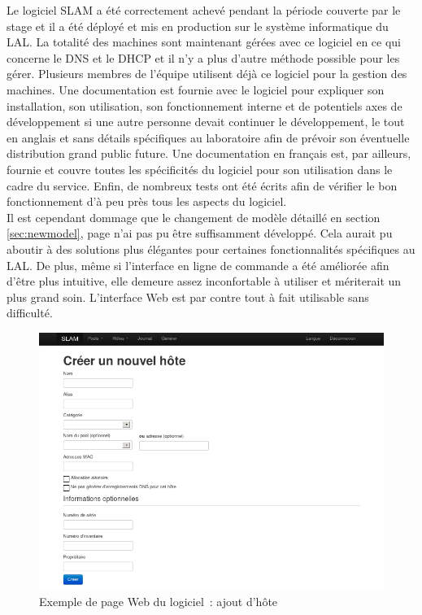 \documentclass[12pt,a4paper,twoside]{report}
\begin{document}
Le logiciel SLAM a été correctement achevé pendant la période couverte par le
stage et il a été déployé et mis en production sur le système informatique du
LAL. La totalité des machines sont maintenant gérées avec ce logiciel en ce qui
concerne le DNS et le DHCP et il n'y a plus d'autre méthode possible pour les gérer.
Plusieurs membres de l’équipe utilisent déjà ce
logiciel pour la gestion des machines. Une documentation est fournie avec le
logiciel pour expliquer son installation, son utilisation, son fonctionnement
interne et de potentiels axes de développement si une autre personne devait
continuer le développement, le tout en anglais et sans détails spécifiques au
laboratoire afin de prévoir son éventuelle distribution grand public future.
Une documentation en français est, par ailleurs, fournie et couvre toutes les
spécificités du logiciel pour son utilisation dans le cadre du service. Enfin,
de nombreux tests ont été écrits afin de vérifier le bon fonctionnement d’à peu
près tous les aspects du logiciel.\\

Il est cependant dommage que le changement de modèle détaillé en section
\ref{sec:newmodel}, page \pageref{sec:newmodel} n’ai pas pu être suffisamment
développé. Cela aurait pu aboutir à des solutions plus élégantes pour certaines
fonctionnalités spécifiques au LAL. De plus, même si l’interface en ligne de
commande a été améliorée afin d’être plus intuitive, elle demeure assez
inconfortable à utiliser et mériterait un plus grand soin. L’interface
Web est par contre tout à fait utilisable sans difficulté.

\begin{center}
\begin{figure}[hbt]
	\includegraphics[scale=0.45]{img/web5.png}
	\caption{Exemple de page Web du logiciel~: ajout d’hôte}
	\label{fig:web5}
\end{figure}
\end{center}
\end{document}
